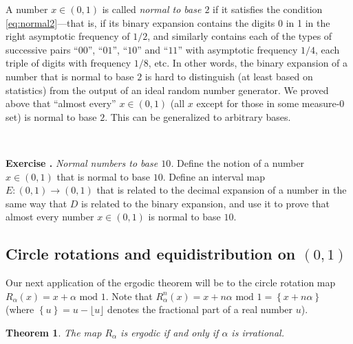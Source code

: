 \documentclass[12pt]{amsart}
\newtheorem{thm}{Theorem}
\newcounter{exercise}
\newcommand{\beginexercise}[1]{\ \\ \addtocounter{exercise}{1} \textbf{Exercise \arabic{exercise}.} \textit{#1.}}
\begin{document}
A number $x\in (0,1)$ is called \emph{normal to base $2$} if it satisfies the condition \eqref{eq:normal2}---that is, if its binary expansion contains the digits 0 in 1 in the right asymptotic frequency of $1/2$, and similarly contains each of the types of successive pairs ``$00$'', ``$01$'', ``$10$'' and ``$11$'' with asymptotic frequency $1/4$, each triple of digits with frequency $1/8$, etc. In other words, the binary expansion of a number that is normal to base $2$ is hard to distinguish (at least based on statistics) from the output of an ideal random number generator. We proved above that ``almost every'' $x\in (0,1)$ (all $x$ except for those in some measure-$0$ set) is normal to base $2$. This can be generalized to arbitrary bases.

\beginexercise{Normal numbers to base $10$} Define the notion of a number $x\in(0,1)$ that is normal to base $10$. Define an interval map $E:(0,1)\to(0,1)$ that is related to the decimal expansion of a number in the same way that $D$ is related to the binary expansion, and use it to prove that almost every number $x\in(0,1)$ is normal to base $10$.



\subsection{Circle rotations and equidistribution on $(0,1)$} Our next application of the ergodic theorem will be to the circle rotation map $R_\alpha(x)=x+\alpha\textrm{ mod }1$. Note that $R_\alpha^n(x)=x+n\alpha\textrm{ mod }1 = \left\{ x+n\alpha \right\}$ (where $\left\{u\right\}=u-\lfloor u \rfloor $ denotes the fractional part of a real number $u$).

\begin{thm} The map $R_\alpha$ is ergodic if and only if $\alpha$ is irrational.
\end{thm}
\end{document}
